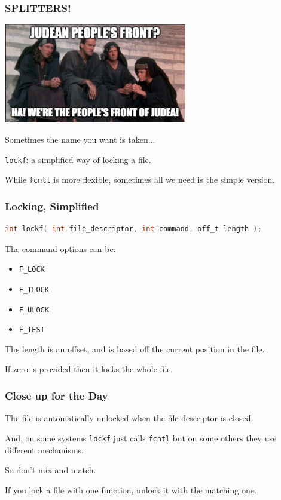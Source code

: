 \begin{frame}
	\frametitle{SPLITTERS!}
	\begin{center}
		\includegraphics[width=0.6\textwidth]{images/jpf.jpg}
	\end{center}

	Sometimes the name you want is taken...

	\texttt{lockf}: a simplified way of locking a file.

	While \texttt{fcntl} is more flexible, sometimes all we need is the simple version.

\end{frame}

\begin{frame}[fragile]
	\frametitle{Locking, Simplified}

	\begin{lstlisting}[language=C]
int lockf( int file_descriptor, int command, off_t length );
\end{lstlisting}

	The command options can be:
	\begin{itemize}
		\item \texttt{F\_LOCK}
		\item \texttt{F\_TLOCK}
		\item \texttt{F\_ULOCK}
		\item \texttt{F\_TEST}
	\end{itemize}

	The length is an offset, and is based off the current position in the file.

	If zero is provided then it locks the whole file.

\end{frame}


\begin{frame}
	\frametitle{Close up for the Day}

	The file is automatically unlocked when the file descriptor is closed.

	And, on some systems \texttt{lockf} just calls \texttt{fcntl} but on some others they use different mechanisms.

	So don't mix and match.

	If you lock a file with one function, unlock it with the matching one.


\end{frame}


